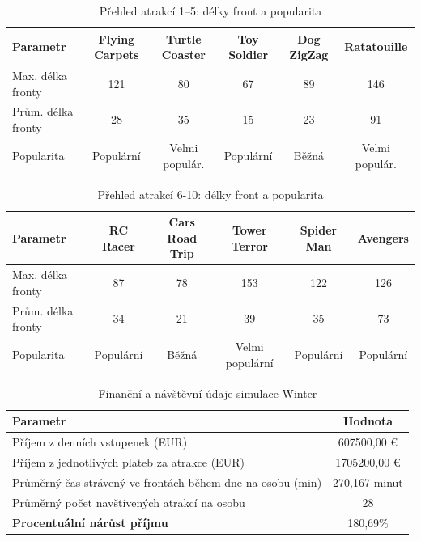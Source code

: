 \documentclass[a4paper,12pt]{article}
\begin{document}
\begin{table}[h!]
	\centering
	\caption{Přehled atrakcí 1–5: délky front a popularita}
	\label{tab:attractions_overview_1_5}
	\begin{tabular}{|l|c|c|c|c|c|}
		\hline
		\textbf{Parametr}&\textbf{Flying Carpets}&\textbf{Turtle Coaster}&\textbf{Toy Soldier}&\textbf{Dog ZigZag}&\textbf{Ratatouille}\\ \hline
		Max. délka fronty   &121                 & 80                 & 67                 & 89                 & 146      \\ \hline
		Prům. délka fronty  &28                 & 35                 & 15                 & 23                 & 91         \\ \hline
		Popularita          &Populární         &Velmi populár.        &Populární          & Běžná          &Velmi populár.\\ \hline
	\end{tabular}
\end{table}
\begin{table}[h!]
	\centering
	\caption{Přehled atrakcí 6-10: délky front a popularita}
	\label{tab:attractions_overview_6_10}
	\begin{tabular}{|l|c|c|c|c|c|}
		\hline
		\textbf{Parametr}   & \textbf{RC  Racer}& \textbf{Cars Road Trip}& \textbf{Tower Terror}& \textbf{Spider Man}& \textbf{Avengers}\\ \hline
		Max. délka fronty   & 87                 & 78                & 153                 & 122               & 126               \\ \hline
		Prům. délka fronty  & 34                & 21                 & 39                & 35                 & 73               \\ \hline
		Popularita          & Populární             & Běžná              & Velmi populární        & Populární          & Populární   \\ \hline
	\end{tabular}
\end{table}

\begin{table}[h!]
	\centering
	\caption{Finanční a návštěvní údaje simulace Winter}
	\label{tab:financial_and_visit_data}
	\begin{tabular}{|l|c|}
		\hline
		\textbf{Parametr}                                         & \textbf{Hodnota} \\ \hline
		Příjem z denních vstupenek (EUR)                          & 607500,00 €   \\ \hline
		Příjem z jednotlivých plateb za atrakce (EUR)             & 1705200,00 €   \\ \hline
		Průměrný čas strávený ve frontách během dne na osobu (min) & 270,167 minut     \\ \hline
		Průměrný počet navštívených atrakcí na osobu             & 28               \\ \hline
		\textbf{Procentuální nárůst příjmu}                       & 180,69\%         \\ \hline
	\end{tabular}
\end{table}
\end{document}
